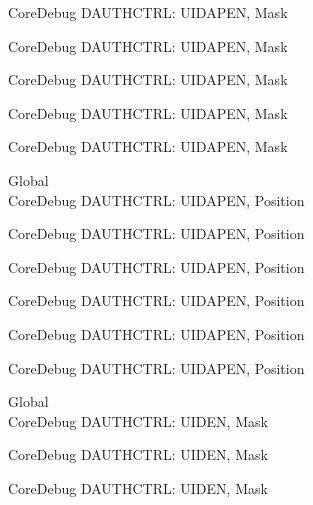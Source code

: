 \begin{DoxyRefList}
\label{deprecated__deprecated000533}%
%
Core\+Debug DAUTHCTRL\+: UIDAPEN, Mask 

\label{deprecated__deprecated000635}%
%
Core\+Debug DAUTHCTRL\+: UIDAPEN, Mask 

\label{deprecated__deprecated000760}%
%
Core\+Debug DAUTHCTRL\+: UIDAPEN, Mask 

\label{deprecated__deprecated001211}%
%
Core\+Debug DAUTHCTRL\+: UIDAPEN, Mask 

\label{deprecated__deprecated001313}%
%
Core\+Debug DAUTHCTRL\+: UIDAPEN, Mask  
\item[Global \doxylink{group___c_m_s_i_s___s_c_b_ga57a2ef70f6cc1e0903a8c3740512de46}{Core\+Debug\+\_\+\+DAUTHCTRL\+\_\+\+UIDAPEN\+\_\+\+Pos} ]\hfill \\
\label{deprecated__deprecated000081}%
%
Core\+Debug DAUTHCTRL\+: UIDAPEN, Position 

\label{deprecated__deprecated000532}%
%
Core\+Debug DAUTHCTRL\+: UIDAPEN, Position 

\label{deprecated__deprecated000634}%
%
Core\+Debug DAUTHCTRL\+: UIDAPEN, Position 

\label{deprecated__deprecated000759}%
%
Core\+Debug DAUTHCTRL\+: UIDAPEN, Position 

\label{deprecated__deprecated001210}%
%
Core\+Debug DAUTHCTRL\+: UIDAPEN, Position 

\label{deprecated__deprecated001312}%
%
Core\+Debug DAUTHCTRL\+: UIDAPEN, Position  
\item[Global \doxylink{group___c_m_s_i_s___s_c_b_ga7d84e1642469f5c20b7ef7fa76a4fe95}{Core\+Debug\+\_\+\+DAUTHCTRL\+\_\+\+UIDEN\+\_\+\+Msk} ]\hfill \\
\label{deprecated__deprecated000080}%
%
Core\+Debug DAUTHCTRL\+: UIDEN, Mask 

\label{deprecated__deprecated000531}%
%
Core\+Debug DAUTHCTRL\+: UIDEN, Mask 

\label{deprecated__deprecated000633}%
%
Core\+Debug DAUTHCTRL\+: UIDEN, Mask 


\end{DoxyRefList}
